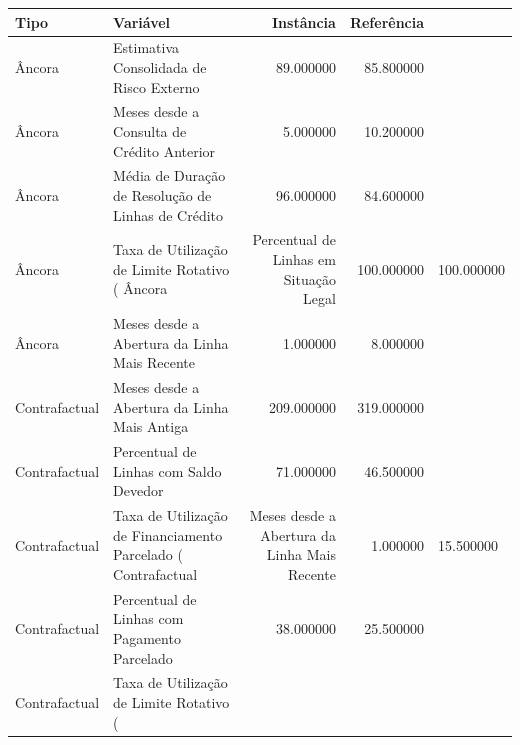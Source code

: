\begin{tabular}{llrr}
\toprule
Tipo & Variável & Instância & Referência \\
\midrule
Âncora & Estimativa Consolidada de Risco Externo & 89.000000 & 85.800000 \\
Âncora & Meses desde a Consulta de Crédito Anterior & 5.000000 & 10.200000 \\
Âncora & Média de Duração de Resolução de Linhas de Crédito & 96.000000 & 84.600000 \\
Âncora & Taxa de Utilização de Limite Rotativo (%
Âncora & Percentual de Linhas em Situação Legal & 100.000000 & 100.000000 \\
Âncora & Meses desde a Abertura da Linha Mais Recente & 1.000000 & 8.000000 \\
Contrafactual & Meses desde a Abertura da Linha Mais Antiga & 209.000000 & 319.000000 \\
Contrafactual & Percentual de Linhas com Saldo Devedor & 71.000000 & 46.500000 \\
Contrafactual & Taxa de Utilização de Financiamento Parcelado (%
Contrafactual & Meses desde a Abertura da Linha Mais Recente & 1.000000 & 15.500000 \\
Contrafactual & Percentual de Linhas com Pagamento Parcelado & 38.000000 & 25.500000 \\
Contrafactual & Taxa de Utilização de Limite Rotativo (%
\bottomrule
\end{tabular}
